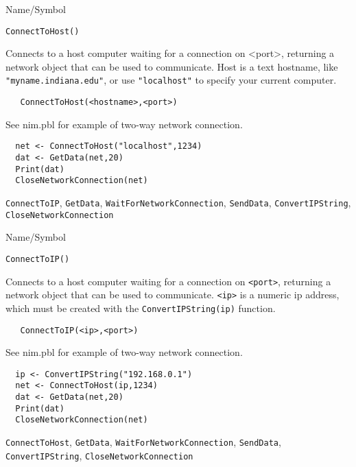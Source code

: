 \rl



\begin{desc}{Name/Symbol}
\item[Name/Symbol]	\verb+ConnectToHost()+

\item[Description]	Connects to a host computer waiting for a
  connection on <port>, returning a network object that can be used to
  communicate.  Host is a text hostname, like \verb+"myname.indiana.edu"+, or
  use \verb+"localhost"+ to specify your current computer.

\item[Usage]
\begin{verbatim}
   ConnectToHost(<hostname>,<port>)
\end{verbatim}

\item[Example]	

  See nim.pbl for example of two-way network connection.
\begin{verbatim}
  net <- ConnectToHost("localhost",1234)
  dat <- GetData(net,20)
  Print(dat)
  CloseNetworkConnection(net)
\end{verbatim}

\item[See Also]
  \verb+ConnectToIP+, \verb+GetData+, 
\verb+WaitForNetworkConnection+, \verb+SendData+, \verb+ConvertIPString+, \verb+CloseNetworkConnection+
\end{desc}

\rl

\begin{desc}{Name/Symbol}
\item[Name/Symbol]	\verb+ConnectToIP()+

\item[Description]	Connects to a host computer waiting for a
  connection on \verb+<port>+, returning a network object that can be used to
  communicate.  \verb+<ip>+ is a numeric ip address, which must be
  created with the \verb+ConvertIPString(ip)+ function. 

\item[Usage]
\begin{verbatim}
   ConnectToIP(<ip>,<port>)
\end{verbatim}

\item[Example]	

  See nim.pbl for example of two-way network connection.
\begin{verbatim}
  ip <- ConvertIPString("192.168.0.1")
  net <- ConnectToHost(ip,1234)
  dat <- GetData(net,20)
  Print(dat)
  CloseNetworkConnection(net)
\end{verbatim}

\item[See Also]
  \verb+ConnectToHost+, \verb+GetData+, \verb+WaitForNetworkConnection+,
   \verb+SendData+, \verb+ConvertIPString+, \verb+CloseNetworkConnection+
\end{desc}

